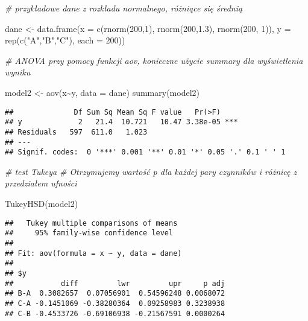 \documentclass[
]{book}
\newenvironment{Shaded}{\begin{snugshade}}{\end{snugshade}}
\newcommand{\AttributeTok}[1]{\textcolor[rgb]{0.77,0.63,0.00}{#1}}
\newcommand{\CommentTok}[1]{\textcolor[rgb]{0.56,0.35,0.01}{\textit{#1}}}
\newcommand{\DecValTok}[1]{\textcolor[rgb]{0.00,0.00,0.81}{#1}}
\newcommand{\FloatTok}[1]{\textcolor[rgb]{0.00,0.00,0.81}{#1}}
\newcommand{\FunctionTok}[1]{\textcolor[rgb]{0.00,0.00,0.00}{#1}}
\newcommand{\NormalTok}[1]{#1}
\newcommand{\OtherTok}[1]{\textcolor[rgb]{0.56,0.35,0.01}{#1}}
\newcommand{\SpecialCharTok}[1]{\textcolor[rgb]{0.00,0.00,0.00}{#1}}
\newcommand{\StringTok}[1]{\textcolor[rgb]{0.31,0.60,0.02}{#1}}
\begin{document}
\begin{Shaded}
\begin{Highlighting}[]
\CommentTok{\# przykładowe dane z rozkładu normalnego, różniące się średnią}

\NormalTok{dane }\OtherTok{\textless{}{-}} \FunctionTok{data.frame}\NormalTok{(}\AttributeTok{x =} \FunctionTok{c}\NormalTok{(}\FunctionTok{rnorm}\NormalTok{(}\DecValTok{200}\NormalTok{,}\DecValTok{1}\NormalTok{), }\FunctionTok{rnorm}\NormalTok{(}\DecValTok{200}\NormalTok{,}\FloatTok{1.3}\NormalTok{), }\FunctionTok{rnorm}\NormalTok{(}\DecValTok{200}\NormalTok{, }\DecValTok{1}\NormalTok{)), }
                   \AttributeTok{y =} \FunctionTok{rep}\NormalTok{(}\FunctionTok{c}\NormalTok{(}\StringTok{"A"}\NormalTok{,}\StringTok{"B"}\NormalTok{,}\StringTok{"C"}\NormalTok{), }\AttributeTok{each =} \DecValTok{200}\NormalTok{))}

\CommentTok{\# ANOVA przy pomocy funkcji aov, konieczne użycie summary dla wyświetlenia wyniku}

\NormalTok{model2 }\OtherTok{\textless{}{-}} \FunctionTok{aov}\NormalTok{(x}\SpecialCharTok{\textasciitilde{}}\NormalTok{y, }\AttributeTok{data =}\NormalTok{ dane)}
\FunctionTok{summary}\NormalTok{(model2)}
\end{Highlighting}
\end{Shaded}

\begin{verbatim}
##              Df Sum Sq Mean Sq F value   Pr(>F)    
## y             2   21.4  10.721   10.47 3.38e-05 ***
## Residuals   597  611.0   1.023                     
## ---
## Signif. codes:  0 '***' 0.001 '**' 0.01 '*' 0.05 '.' 0.1 ' ' 1
\end{verbatim}

\begin{Shaded}
\begin{Highlighting}[]
\CommentTok{\# test Tukeya}
\CommentTok{\# Otrzymujemy wartość p dla każdej pary czynników i różnicę z przedziałem ufności}

\FunctionTok{TukeyHSD}\NormalTok{(model2)}
\end{Highlighting}
\end{Shaded}

\begin{verbatim}
##   Tukey multiple comparisons of means
##     95% family-wise confidence level
## 
## Fit: aov(formula = x ~ y, data = dane)
## 
## $y
##           diff         lwr         upr     p adj
## B-A  0.3082657  0.07056901  0.54596248 0.0068072
## C-A -0.1451069 -0.38280364  0.09258983 0.3238938
## C-B -0.4533726 -0.69106938 -0.21567591 0.0000264
\end{verbatim}
\end{document}

